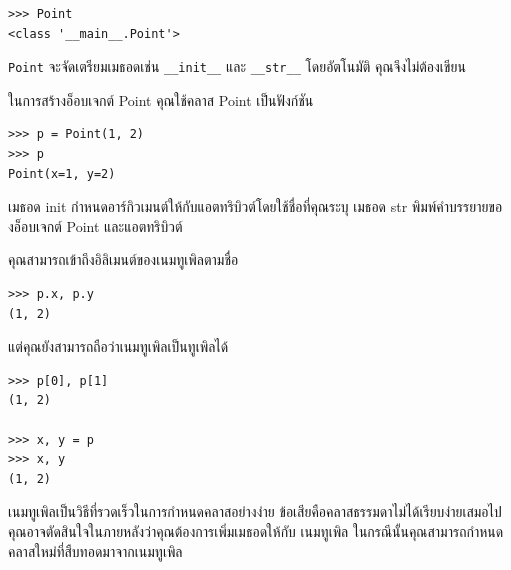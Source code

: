
\begin{verbatim}
>>> Point
<class '__main__.Point'>
\end{verbatim}


{\tt Point} จะจัดเตรียมเมธอดเช่น \verb"__init__" และ \verb"__str__" โดยอัตโนมัติ คุณจึงไม่ต้องเขียน

ในการสร้างอ็อบเจกต์ Point คุณใช้คลาส Point เป็นฟังก์ชัน

\begin{verbatim}
>>> p = Point(1, 2)
>>> p
Point(x=1, y=2)
\end{verbatim}

เมธอด init กำหนดอาร์กิวเมนต์ให้กับแอตทริบิวต์โดยใช้ชื่อที่คุณระบุ เมธอด str พิมพ์คำบรรยายของอ็อบเจกต์ Point และแอตทริบิวต์

คุณสามารถเข้าถึงอิลิเมนต์ของเนมทูเพิลตามชื่อ

\begin{verbatim}
>>> p.x, p.y
(1, 2)
\end{verbatim}

แต่คุณยังสามารถถือว่าเนมทูเพิลเป็นทูเพิลได้

\begin{verbatim}
>>> p[0], p[1]
(1, 2)

>>> x, y = p
>>> x, y
(1, 2)
\end{verbatim}

เนมทูเพิลเป็นวิธีที่รวดเร็วในการกำหนดคลาสอย่างง่าย ข้อเสียคือคลาสธรรมดาไม่ได้เรียบง่ายเสมอไป 
คุณอาจตัดสินใจในภายหลังว่าคุณต้องการเพิ่มเมธอดให้กับ เนมทูเพิล ในกรณีนั้นคุณสามารถกำหนดคลาสใหม่ที่สืบทอดมาจากเนมทูเพิล



